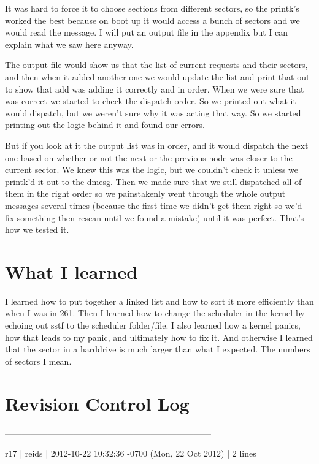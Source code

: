 \documentclass[letterpaper,10pt]{article}
\begin{document}
It was hard to force it to choose sections from different sectors, so the printk's worked the best because on boot up it would access a bunch of sectors and we would read the message. I will put an output file in the appendix but I can explain what we saw here anyway. 

The output file would show us that the list of current requests and their sectors, and then when it added another one we would update the list and print that out to show that add was adding it correctly and in order. When we were sure that was correct we started to check the dispatch order. So we printed out what it would dispatch, but we weren't sure why it was acting that way. So we started printing out the logic behind it and found our errors. 

But if you look at it the output list was in order, and it would dispatch the next one based on whether or not the next or the previous node was closer to the current sector. We knew this was the logic, but we couldn't check it unless we printk'd it out to the dmesg. Then we made sure that we still dispatched all of them in the right order so we painstakenly went through the whole output messages several times (because the first time we didn't get them right so we'd fix something then rescan until we found a mistake) until it was perfect. That's how we tested it. 

\section{What I learned}
I learned how to put together a linked list and how to sort it more efficiently than when I was in 261. Then I learned how to change the scheduler in the kernel by echoing out sstf to the scheduler folder/file. I also learned how a kernel panics, how that leads to my panic, and ultimately how to fix it. And otherwise I learned that the sector in a harddrive is much larger than what I expected. The numbers of sectors I mean. 

\section{Revision Control Log}


------------------------------------------------------------------------ 

r17 | reids | 2012-10-22 10:32:36 -0700 (Mon, 22 Oct 2012) | 2 lines 
\end{document}
